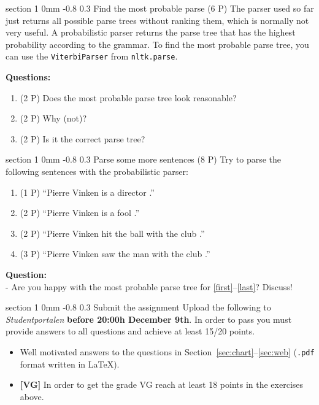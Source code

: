 \documentclass[11pt]{article}
\makeatletter
\newcommand{\newsec}[2]{\section{#1}\label{sec:#2}\noindent}
\renewcommand{\section}{\@startsection
{section}%
{1}%
{0mm}%
{-0.8\baselineskip}%
{0.3\baselineskip}%
{\bfseries\large}}%
\makeatother
\begin{document}
\newsec{Find the most probable parse (6 P)}{viterbi}%
The parser used so far just returns all possible parse trees without
ranking them, which is normally not very useful.  A probabilistic
parser returns the parse tree that has the highest probability
according to the grammar. To find the most probable parse tree, you
can use the {\tt ViterbiParser} from {\tt nltk.parse}.
\begin{center}
\fbox{

}
\end{center}
{\bf Questions:}
\begin{enumerate}[noitemsep,topsep=0.2cm]
\item (2 P) Does the most probable parse tree look reasonable? 
\item (2 P) Why (not)? 
\item (2 P) Is it the correct parse tree?
\end{enumerate}

\clearpage \newsec{Parse some more sentences (8 P)}{web}%
Try to parse the following sentences with the probabilistic parser:
\begin{enumerate}[noitemsep,topsep=0.2cm]
\item (1 P) ``Pierre Vinken is a director .''\label{first}
\item (2 P) ``Pierre Vinken is a fool .''
\item (2 P) ``Pierre Vinken hit the ball with the club .''
\item (3 P) ``Pierre Vinken saw the man with the club .''\label{last}
\end{enumerate}

\noindent
{\bf Question:}\\
- Are you happy with the most probable parse tree for
\ref{first}--\ref{last}? Discuss!

\newsec{Submit the assignment}{sub}%
Upload the following to {\it Studentportalen}
\textbf{before 20:00h December 9th}. In order to pass you must provide
answers to all questions and achieve at least 15/20 points.
\begin{itemize}[noitemsep,topsep=0.2cm]
\item Well motivated answers to the questions in
  Section~\ref{sec:chart}--\ref{sec:web} (\texttt{.pdf} format written
  in \LaTeX).
\item \textbf{[VG]} In order to get the grade VG reach at least 18
  points in the exercises above.
\end{itemize}
\end{document}
